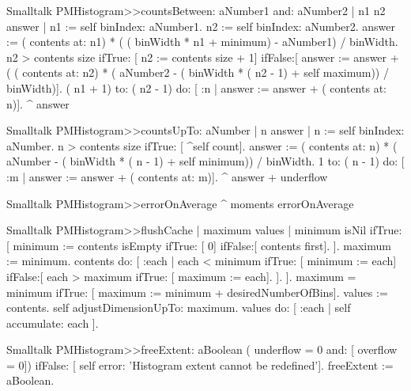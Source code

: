 \begin{displaycode}{Smalltalk}
PMHistogram>>countsBetween: aNumber1 and: aNumber2
    | n1 n2 answer |
    n1 := self binIndex: aNumber1.
    n2 := self binIndex: aNumber2.
    answer := ( contents at: n1) * ( ( binWidth * n1 + minimum) - 
                                                 aNumber1) / binWidth.
    n2 > contents size
        ifTrue: [ n2 := contents size + 1]
        ifFalse:[ answer := answer + ( ( contents at: n2) * ( 
      aNumber2 - ( binWidth * ( n2 - 1) + self maximum)) / binWidth)].
    ( n1 + 1) to: ( n2 - 1) do: [ :n | answer := answer + ( contents 
                                                              at: n)].
    ^ answer
\end{displaycode}
  
\begin{displaycode}{Smalltalk}
PMHistogram>>countsUpTo: aNumber
    | n answer |
    n := self binIndex: aNumber.
    n > contents size
        ifTrue: [ ^self count].
    answer := ( contents at: n) * ( aNumber - ( binWidth * ( n - 1) + 
                                            self minimum)) / binWidth.
    1 to: ( n - 1) do: [ :m | answer := answer + ( contents at: m)].
    ^ answer + underflow
\end{displaycode}
  
\begin{displaycode}{Smalltalk}
PMHistogram>>errorOnAverage
    ^ moments errorOnAverage
\end{displaycode}
  
\begin{displaycode}{Smalltalk}
PMHistogram>>flushCache
    | maximum values |
    minimum isNil
        ifTrue: [ minimum := contents isEmpty ifTrue: [ 0]                     
                                            ifFalse:[ contents first].
                   ].
    maximum := minimum.
    contents do:
        [ :each |
          each < minimum
            ifTrue: [ minimum := each]
            ifFalse:[ each > maximum
                            ifTrue: [ maximum := each].
                        ].
        ].
    maximum = minimum
        ifTrue: [ maximum := minimum + desiredNumberOfBins].
    values := contents.
    self adjustDimensionUpTo: maximum.
    values do: [ :each | self accumulate: each ].
\end{displaycode}
    
\begin{displaycode}{Smalltalk}
PMHistogram>>freeExtent: aBoolean
    ( underflow = 0 and: [ overflow = 0])
        ifFalse: [ self error: 'Histogram extent cannot be 
                                                          redefined'].
    freeExtent := aBoolean.
\end{displaycode}
  

